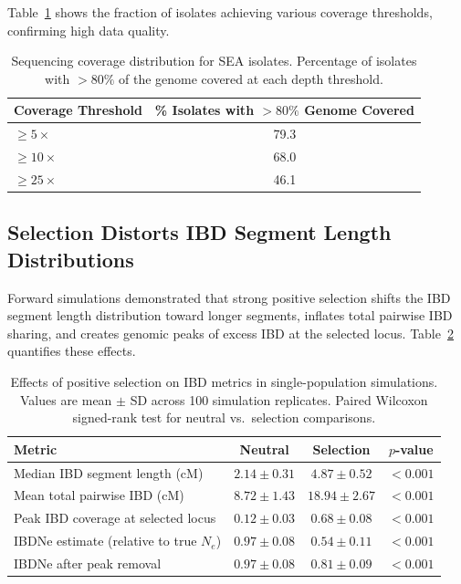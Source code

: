 \documentclass[11pt]{article}
\begin{document}
Table~\ref{tab:coverage} shows the fraction of isolates achieving various coverage thresholds, confirming high data quality.

\begin{table}[H]
\centering
\caption{Sequencing coverage distribution for SEA isolates. Percentage of isolates with $>80\%$ of the genome covered at each depth threshold.}
\label{tab:coverage}
\begin{tabular}{lc}
\toprule
Coverage Threshold & \% Isolates with $>80\%$ Genome Covered \\
\midrule
$\geq 5\times$ & 79.3 \\
$\geq 10\times$ & 68.0 \\
$\geq 25\times$ & 46.1 \\
\bottomrule
\end{tabular}
\end{table}

\subsection{Selection Distorts IBD Segment Length Distributions}

Forward simulations demonstrated that strong positive selection shifts the IBD segment length distribution toward longer segments, inflates total pairwise IBD sharing, and creates genomic peaks of excess IBD at the selected locus. Table~\ref{tab:sim_ibd} quantifies these effects.

\begin{table}[H]
\centering
\caption{Effects of positive selection on IBD metrics in single-population simulations. Values are mean $\pm$ SD across 100 simulation replicates. Paired Wilcoxon signed-rank test for neutral vs.\ selection comparisons.}
\label{tab:sim_ibd}
\begin{tabular}{lccc}
\toprule
Metric & Neutral & Selection & $p$-value \\
\midrule
Median IBD segment length (cM) & $2.14 \pm 0.31$ & $4.87 \pm 0.52$ & $< 0.001$ \\
Mean total pairwise IBD (cM) & $8.72 \pm 1.43$ & $18.94 \pm 2.67$ & $< 0.001$ \\
Peak IBD coverage at selected locus & $0.12 \pm 0.03$ & $0.68 \pm 0.08$ & $< 0.001$ \\
IBDNe estimate (relative to true $N_e$) & $0.97 \pm 0.08$ & $0.54 \pm 0.11$ & $< 0.001$ \\
IBDNe after peak removal & $0.97 \pm 0.08$ & $0.81 \pm 0.09$ & $< 0.001$ \\
\bottomrule
\end{tabular}
\end{table}
\end{document}
